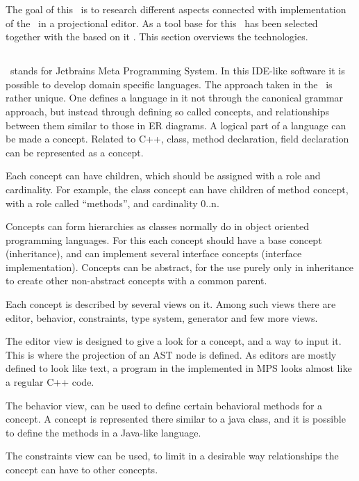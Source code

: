 The goal of this \MT\ is to research different aspects connected with implementation of the \cpppl\ in a projectional editor.
As a tool base for this \jbmps\ has been selected together with the based on it \mbdrp. This section overviews the technologies.

\subsection{\jbmps}

\jbmps\ stands for Jetbrains Meta Programming System. In this IDE-like software it is possible to develop domain specific languages.
The approach taken in the \jbmps\ is rather unique. One defines a language in it not through the canonical grammar approach, but instead
through defining so called concepts, and relationships between them similar to those in ER diagrams. A logical part of a language can be made 
a concept. Related to C++, class, method declaration, field declaration can be represented as a concept. 

Each concept can have children, which should be assigned with a role and cardinality. For example, the class concept can have children of method concept,
with a role called ``methods'', and cardinality 0..n.

Concepts can form hierarchies as classes normally do in object oriented programming languages. For this each concept should have a base concept (inheritance),
and can implement several interface concepts (interface implementation). Concepts can be abstract, for the use purely only in inheritance to create other 
non-abstract concepts with a common parent.

Each concept is described by several views on it. Among such views there are editor, behavior, constraints, type system, generator and few more views.

The editor view is designed to give a look for a concept, and a way to input it. This is where the projection of an AST node is defined. As editors 
are mostly defined to look like text, a program in the \cpppl implemented in MPS looks almost like a regular C++ code.

The behavior view, can be used to define certain behavioral methods for a concept. A concept is represented there similar to a java class, and
it is possible to define the methods in a Java-like language.

The constraints view can be used, to limit in a desirable way relationships the concept can have to other concepts.


